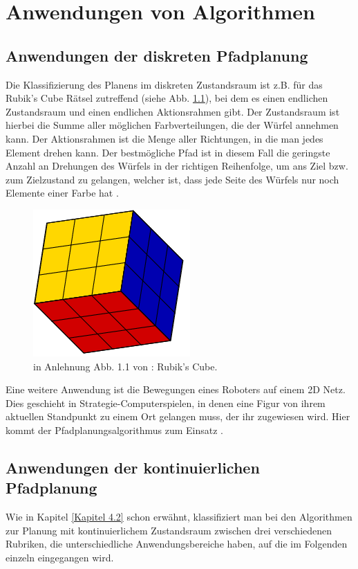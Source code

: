 
\chapter{Anwendungen von Algorithmen}
\section{Anwendungen der diskreten Pfadplanung}
Die Klassifizierung des Planens im  diskreten Zustandsraum ist z.B. für das Rubik's Cube Rätsel zutreffend (siehe Abb. \ref{Abb. 5.1}), bei dem es einen endlichen Zustandsraum und einen endlichen Aktionsrahmen gibt. Der Zustandsraum ist hierbei die Summe aller möglichen Farbverteilungen, die der Würfel annehmen kann. Der Aktionsrahmen ist die Menge aller Richtungen, in die man jedes Element drehen kann. Der bestmögliche Pfad ist in diesem Fall die geringste Anzahl an Drehungen des Würfels in der richtigen Reihenfolge, um ans Ziel bzw. zum Zielzustand zu gelangen, welcher ist, dass jede Seite des Würfels nur noch Elemente einer Farbe hat \cite[~S. 20]{Lav06}.\\
\begin{figure}
	\centering
	\includegraphics[width=0.4\linewidth]{images/img229}
	\caption{in Anlehnung Abb. 1.1 von \cite[~S. 5]{Lav06}: Rubik's Cube.}
	\label{Abb. 5.1}
\end{figure}%

Eine weitere Anwendung ist die Bewegungen eines Roboters auf einem 2D Netz. Dies geschieht in Strategie-Computerspielen, in denen eine Figur von ihrem aktuellen Standpunkt zu einem Ort gelangen muss, der ihr zugewiesen wird. Hier kommt der Pfadplanungsalgorithmus zum Einsatz \cite{cui2011based}.%
\section{Anwendungen der kontinuierlichen Pfadplanung}
Wie in Kapitel \ref{Kapitel 4.2} schon erwähnt, klassifiziert man bei den Algorithmen zur Planung mit kontinuierlichem Zustandsraum zwischen drei verschiedenen Rubriken, die unterschiedliche Anwendungsbereiche haben, auf die im Folgenden einzeln eingegangen wird.

